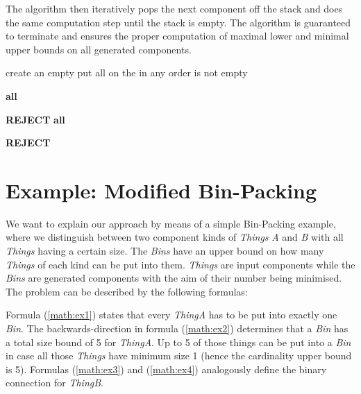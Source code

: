 \documentclass[copyright,creativecommons]{eptcs}
\begin{document}
The algorithm then iteratively pops the next component off the stack and does the same computation step until the stack is empty. 
The algorithm is guaranteed to terminate and ensures the proper computation of maximal lower and minimal upper bounds on all generated components. 

\begin{codebox}
\Procname{}
\li create an empty 		\label{li:1}
\li put all  on the  in any order \label{li:stack}
\li \While {} is not empty
\li \Do 
				
\li			\For \textbf{all}  \label{li:binary-comps}
				\li \Do
								\If 
\li									\Then
												
								\li 		\If  \label{li:new-bounds}
								\li     		\Then 
																
\li															\If  \label{li:consistency}
\li																	\Then
	 																			 \label{li:push1}
\li																	\Else
																				{\bf REJECT}
																		\End
\End
										\End
						\End
\li			\If 
\li					\Then
								\For \textbf{all}  \label{li:1-to-many-comps}
\li									\Do
												
\li											\If 
\li													\Then
																
\li															\If 
\li																	\Then
	 																			
\li																	\Else
																				{\bf REJECT}
																		\End
\End
										\End
						\End
		\End
{}		
\end{codebox}

\section{Example: Modified Bin-Packing}

We want to explain our approach by means of a simple Bin-Packing example, where we distinguish between two component kinds of \textit{Things} \textit{A} and \textit{B} with all \textit{Things} having a certain size. 
The \textit{Bins} have an upper bound on how many \textit{Things} of each kind can be put into them. 
\textit{Things} are input components while the \textit{Bins} are generated components with the aim of their number being minimised. 
The problem can be described by the following formulas: 


                                   
Formula (\ref{math:ex1}) states that every \textit{ThingA} has to be put into exactly one \textit{Bin}. 
The backwards-direction in formula (\ref{math:ex2}) determines that a \textit{Bin} has a total size bound of 5 for \textit{ThingA}. 
Up to 5 of those things can be put into a \textit{Bin} in case all those \textit{Things} have minimum size 1 (hence the cardinality upper bound is 5). 
Formulas (\ref{math:ex3}) and (\ref{math:ex4}) analogously define the binary connection for \textit{ThingB}. 
\end{document}
